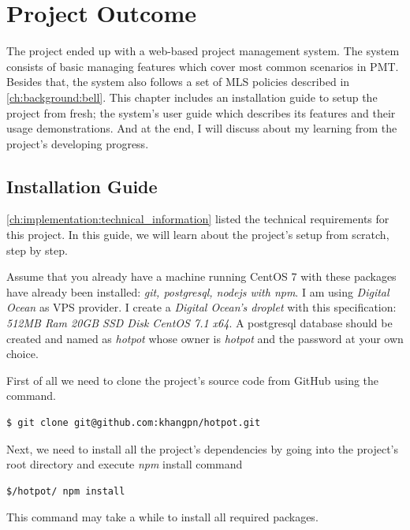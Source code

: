 
\chapter{Project Outcome} %

\label{ch:outcome} 


The project ended up with a web-based project management system.
The system consists of basic managing features which cover most common scenarios in PMT.
Besides that, the system also follows a set of MLS policies described in \autoref{ch:background:bell}.
This chapter includes an installation guide to setup the project from fresh; 
the system's user guide which describes its features and their usage demonstrations.
And at the end, I will discuss about my learning from the project's developing progress.


\section{Installation Guide}
\label{ch:result:installation_guide}

\autoref{ch:implementation:technical_information} listed the technical requirements for this project.
In this guide, we will learn about the project's setup from scratch, step by step.

Assume that you already have a machine running CentOS 7 with these packages have already been installed: \emph{git, postgresql, nodejs with npm}.
I am using \emph{Digital Ocean} as VPS provider.
I create a \emph{Digital Ocean's droplet} with this specification: \emph{512MB Ram 20GB SSD Disk CentOS 7.1 x64}.
A postgresql database should be created and named as \emph{hotpot} whose owner is \emph{hotpot} and the password at your own choice.

First of all we need to clone the project's source code from GitHub using the command.
\begin{lstlisting}[breaklines=false,frame=lt]
$ git clone git@github.com:khangpn/hotpot.git
\end{lstlisting}

Next, we need to install all the project's dependencies by going into the project's root directory and execute \emph{npm} install command
\begin{lstlisting}[breaklines=false,frame=lt]
$/hotpot/ npm install
\end{lstlisting}
This command may take a while to install all required packages.

